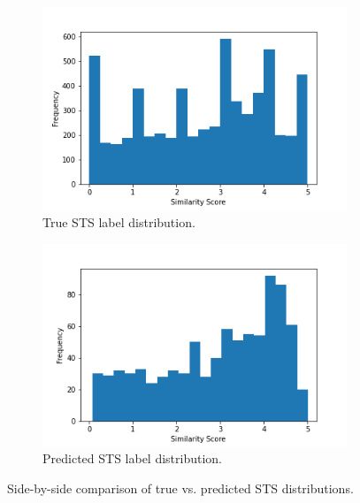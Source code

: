 \documentclass{article}
\begin{document}
\begin{figure}[h]
    \centering
    \begin{subfigure}[b]{0.49\linewidth}
    \includegraphics[width=\linewidth]{true_sts.png}
        \caption{True STS label distribution.}
        \label{fig: true-dist}
    \end{subfigure}
    \begin{subfigure}[b]{0.49\linewidth}
        \includegraphics[width=\linewidth]{pred_sts.png}
        \caption{Predicted STS label distribution.}
        \label{fig: skewed-pred}
    \end{subfigure}
    \caption{Side-by-side comparison of true vs. predicted STS distributions.}
    \label{fig:ps3q3e}
\end{figure}
\vspace{-0.2cm}
\end{document}
